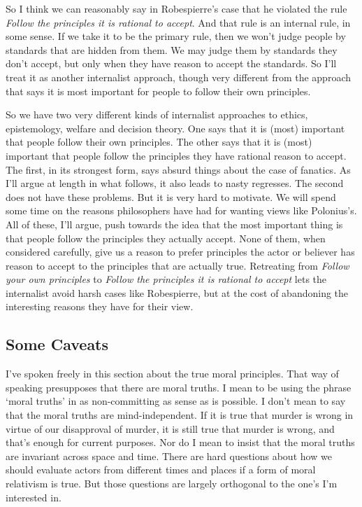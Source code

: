 So I think we can reasonably say in \gls{Robespierre}'s case that he violated the rule \emph{Follow the principles it is rational to accept}. And that rule is an internal rule, in some sense. If we take it to be the primary rule, then we won't judge people by standards that are hidden from them. We may judge them by standards they don't accept, but only when they have reason to accept the standards. So I'll treat it as another internalist approach, though very different from the approach that says it is most important for people to follow their own principles.

So we have two very different kinds of internalist approaches to ethics, epistemology, welfare and decision theory. One says that it is (most) important that people follow their own principles. The other says that it is (most) important that people follow the principles they have rational reason to accept. The first, in its strongest form, says absurd things about the case of fanatics. As I'll argue at length in what follows, it also leads to nasty regresses. The second does not have these problems. But it is very hard to motivate. We will spend some time on the reasons philosophers have had for wanting views like Polonius's. All of these, I'll argue, push towards the idea that the most important thing is that people follow the principles they actually accept. None of them, when considered carefully, give us a reason to prefer principles the actor or believer has reason to accept to the principles that are actually true. Retreating from \emph{Follow your own principles} to \emph{Follow the principles it is rational to accept} lets the internalist avoid harsh cases like \gls{Robespierre}, but at the cost of abandoning the interesting reasons they have for their view.

\subsection{Some Caveats}
\label{somecaveats}

I've spoken freely in this section about the true moral principles. That way of speaking presupposes that there are moral truths. I mean to be using the phrase `moral truths' in as non-committing as sense as is possible. I don't mean to say that the moral truths are mind-independent. If it is true that murder is wrong in virtue of our disapproval of murder, it is still true that murder is wrong, and that's enough for current purposes. Nor do I mean to insist that the moral truths are invariant across space and time. There are hard questions about how we should evaluate actors from different times and places if a form of moral relativism is true. But those questions are largely orthogonal to the one's I'm interested in.

